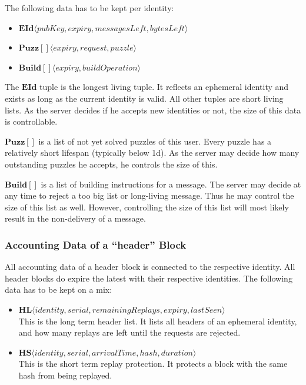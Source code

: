 The following data has to be kept per identity:
\begin{itemize}
	\item $\mathbf{EId}\langle pubKey, expiry, messagesLeft, bytesLeft \rangle$
	\item $\mathbf{Puzz[]}\langle expiry, request, puzzle \rangle$
	\item $\mathbf{Build[]}\langle expiry, buildOperation \rangle$
\end{itemize}

The $\mathbf{EId}$ tuple is the longest living tuple. It reflects an ephemeral identity and exists as long as the current identity is valid. All other tuples are short living lists. As the server decides if he accepts new identities or not, the size of this data is controllable.

$\mathbf{Puzz[]}$ is a list of not yet solved puzzles of this user. Every puzzle has a relatively short lifespan (typically below 1d). As the server may decide how many outstanding puzzles he accepts, he controls the size of this.

$\mathbf{Build[]}$ is a list of building instructions for a message. The server may decide at any time to reject a too big list or long-living message. Thus he may control the size of this list as well. However, controlling the size of this list will most likely result in the non-delivery of a message.

\subsubsection{Accounting Data of a ``header'' Block}
All accounting data of a header block is connected to the respective identity. All header blocks do expire the latest with their respective identities. The following data has to be kept on a mix:
\begin{itemize}
	\item $\mathbf{HL}\langle identity, serial, remainingReplays, expiry, lastSeen \rangle$\\
	This is the long term header list. It lists all headers of an ephemeral identity, and how many replays are left until the requests are rejected.
	\item $\mathbf{HS}\langle identity, serial, arrivalTime, hash, duration \rangle$\\
	This is the short term replay protection. It protects a block with the same hash from being replayed.
\end{itemize}

